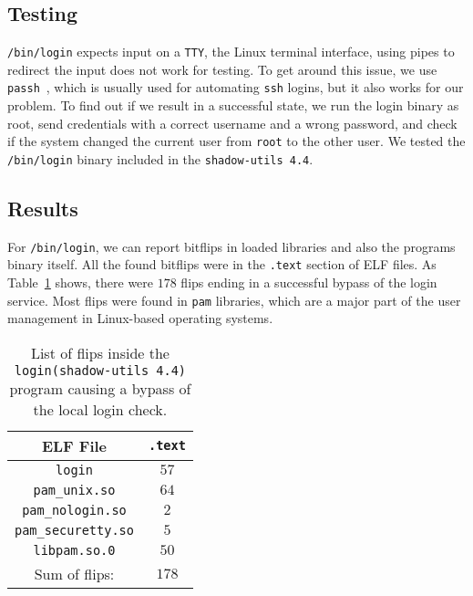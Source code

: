 \subsection{Testing}

\texttt{/bin/login} expects input on a \texttt{TTY}, the Linux terminal
interface, using pipes to redirect the input does not work for testing. To get
around this issue, we use \texttt{passh}~\cite{passhweb}, which is usually used
for automating \texttt{ssh} logins, but it also works for our problem. To find
out if we result in a successful state, we run the login binary as root, send
credentials with a correct username and a wrong password, and check if the
system changed the current user from \texttt{root} to the other user. We tested
the \texttt{/bin/login} binary included in the \texttt{shadow-utils 4.4}.

\subsection{Results}

For \texttt{/bin/login}, we can report bitflips in loaded libraries and also the
program\textquotesingle s binary itself. All the found bitflips were in the
\texttt{.text} section of ELF files. As Table~\ref{tab:loginres} shows, there
were $178$ flips ending in a successful bypass of the login service. Most flips
were found in \texttt{pam} libraries, which are a major part of the user
management in Linux-based operating systems.

\begin{table}[!htb]
\centering
\begin{tabular}{c|c}
ELF File               & \texttt{.text} \\ \hline
\texttt{login}         & $57$ \\
\texttt{pam\_unix.so} & $64$ \\
\texttt{pam\_nologin.so} & $2$ \\
\texttt{pam\_securetty.so} & $5$ \\
\texttt{libpam.so.0} & $50$ \\ \hline
Sum of flips:                 & $178$
\end{tabular}
\caption{List of flips inside the \texttt{login(shadow-utils 4.4)} program
causing a bypass of the local login check.}
\label{tab:loginres}
\end{table}

